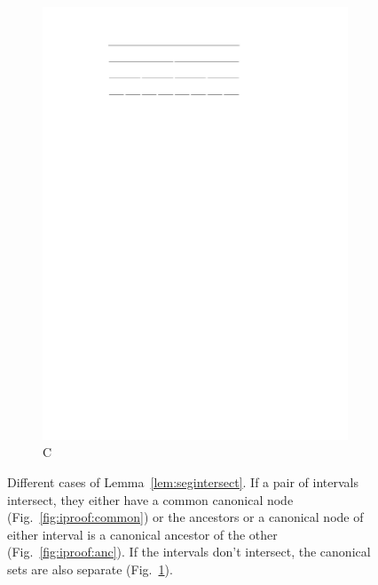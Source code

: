 \documentclass[english,gradu]{tktltiki2018}
\begin{document}
\begin{figure}
\begin{subfigure}[t]{0.3\textwidth}
		\includegraphics[width=\textwidth,page=2]{fig/iproof}
		\caption{C}\label{fig:iproof:no}
	\end{subfigure}
	\caption{Different cases of Lemma~\ref{lem:segintersect}.
	If a pair of intervals intersect, they either have a common canonical node (Fig.~\ref{fig:iproof:common}) or the ancestors or a canonical node of either interval is a canonical ancestor of the other (Fig.~\ref{fig:iproof:anc}).
	If the intervals don't intersect, the canonical sets are also separate (Fig.~\ref{fig:iproof:no}).}\label{fig:iproof}
\end{figure}
\end{document}
